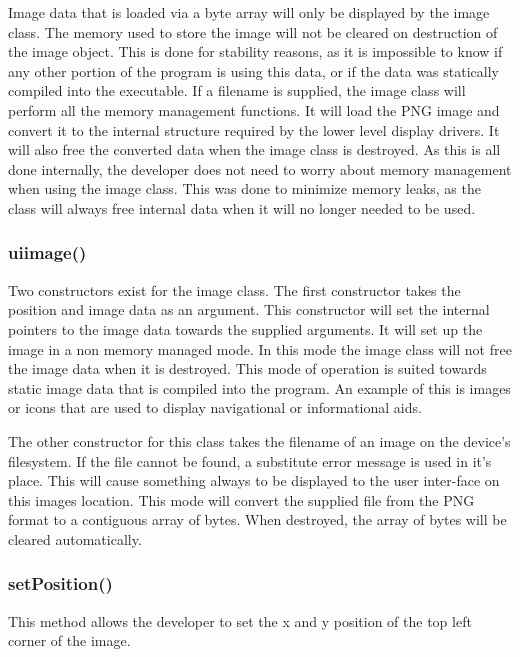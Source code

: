 Image data that is loaded via a byte array will only be displayed by the image class. The memory used to store the image will not be cleared on destruction of the image object. This is done for stability reasons, as it is impossible to know if any other portion of the program is using this data, or if the data was statically compiled into the executable. If a filename is supplied, the image class will perform all the memory management functions. It will load the PNG image and convert it to the internal structure required by the lower level display drivers. It will also free the converted data when the image class is destroyed. As this is all done internally, the developer does not need to worry about memory management when using the image class. This was done to minimize memory leaks, as the class will always free internal data when it will no longer needed to be used.

\subsubsection{uiimage()}

Two constructors exist for the image class. The first constructor takes the position and image data as an argument. This constructor will set the internal pointers to the image data towards the supplied arguments. It will set up the image in a non memory managed mode. In this mode the image class will not free the image data when it is destroyed. This mode of operation is suited towards static image data that is compiled into the program. An example of this is images or icons that are used to display navigational or informational aids.

The other constructor for this class takes the filename of an image on the device's filesystem. If the file cannot be found, a substitute error message is used in it's place. This will cause something always to be displayed to the user inter-face on this images location. This mode will convert the supplied file from the PNG format to a contiguous array of bytes. When destroyed, the array of bytes will be cleared automatically. 


\subsubsection{setPosition()}

This method allows the developer to set the x and y position of the top left corner of the image.



